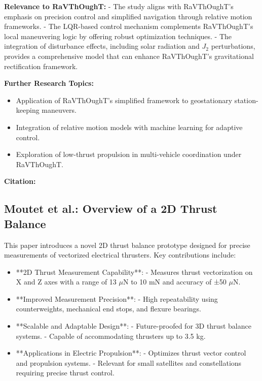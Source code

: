 \textbf{Relevance to RaVThOughT:}
- The study aligns with RaVThOughT's emphasis on precision control and simplified navigation through relative motion frameworks.
- The LQR-based control mechanism complements RaVThOughT's local maneuvering logic by offering robust optimization techniques.
- The integration of disturbance effects, including solar radiation and \( J_2 \) perturbations, provides a comprehensive model that can enhance RaVThOughT’s gravitational rectification framework.

\textbf{Further Research Topics:}
\begin{itemize}
  \item Application of RaVThOughT's simplified framework to geostationary station-keeping maneuvers.
  \item Integration of relative motion models with machine learning for adaptive control.
  \item Exploration of low-thrust propulsion in multi-vehicle coordination under RaVThOughT.
\end{itemize}

\textbf{Citation:} 

\subsection{Moutet et al.: Overview of a 2D Thrust Balance}

This paper introduces a novel 2D thrust balance prototype designed for precise measurements of vectorized electrical thrusters. Key contributions include:

\begin{itemize}
  \item **2D Thrust Measurement Capability**:
  - Measures thrust vectorization on X and Z axes with a range of 13 \(\mu\text{N}\) to 10 \(\text{mN}\) and accuracy of ±50 \(\mu\text{N}\).

  \item **Improved Measurement Precision**:
  - High repeatability using counterweights, mechanical end stops, and flexure bearings.

  \item **Scalable and Adaptable Design**:
  - Future-proofed for 3D thrust balance systems.
  - Capable of accommodating thrusters up to 3.5 kg.

  \item **Applications in Electric Propulsion**:
  - Optimizes thrust vector control and propulsion systems.
  - Relevant for small satellites and constellations requiring precise thrust control.
\end{itemize}

